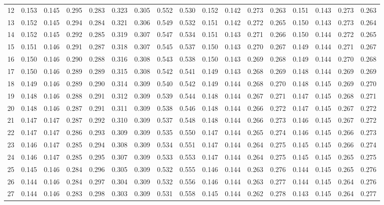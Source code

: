 \documentclass{report}
\begin{document}
\begin{appendices}
\begin{sidewaystable}
\begin{tabular}{|c|cccc|cccc|cccc|cccc|}
12 & 0.153 & 0.145 & 0.295 & 0.283 & 0.323 & 0.305 & 0.552 & 0.530 & 0.152 & 0.142 & 0.273 & 0.263 & 0.151 & 0.143 & 0.273 & 0.263\\
13 & 0.152 & 0.145 & 0.294 & 0.284 & 0.321 & 0.306 & 0.549 & 0.532 & 0.151 & 0.142 & 0.272 & 0.265 & 0.150 & 0.143 & 0.273 & 0.264\\
14 & 0.152 & 0.145 & 0.292 & 0.285 & 0.319 & 0.307 & 0.547 & 0.534 & 0.151 & 0.143 & 0.271 & 0.266 & 0.150 & 0.144 & 0.272 & 0.265\\
15 & 0.151 & 0.146 & 0.291 & 0.287 & 0.318 & 0.307 & 0.545 & 0.537 & 0.150 & 0.143 & 0.270 & 0.267 & 0.149 & 0.144 & 0.271 & 0.267\\
16 & 0.150 & 0.146 & 0.290 & 0.288 & 0.316 & 0.308 & 0.543 & 0.538 & 0.150 & 0.143 & 0.269 & 0.268 & 0.149 & 0.144 & 0.270 & 0.268\\
17 & 0.150 & 0.146 & 0.289 & 0.289 & 0.315 & 0.308 & 0.542 & 0.541 & 0.149 & 0.143 & 0.268 & 0.269 & 0.148 & 0.144 & 0.269 & 0.269\\
18 & 0.149 & 0.146 & 0.289 & 0.290 & 0.314 & 0.309 & 0.540 & 0.542 & 0.149 & 0.144 & 0.268 & 0.270 & 0.148 & 0.145 & 0.269 & 0.270\\
19 & 0.148 & 0.146 & 0.288 & 0.291 & 0.312 & 0.309 & 0.539 & 0.544 & 0.148 & 0.144 & 0.267 & 0.271 & 0.147 & 0.145 & 0.268 & 0.271\\
20 & 0.148 & 0.146 & 0.287 & 0.291 & 0.311 & 0.309 & 0.538 & 0.546 & 0.148 & 0.144 & 0.266 & 0.272 & 0.147 & 0.145 & 0.267 & 0.272\\
21 & 0.147 & 0.147 & 0.287 & 0.292 & 0.310 & 0.309 & 0.537 & 0.548 & 0.148 & 0.144 & 0.266 & 0.273 & 0.146 & 0.145 & 0.267 & 0.272\\
22 & 0.147 & 0.147 & 0.286 & 0.293 & 0.309 & 0.309 & 0.535 & 0.550 & 0.147 & 0.144 & 0.265 & 0.274 & 0.146 & 0.145 & 0.266 & 0.273\\
23 & 0.146 & 0.147 & 0.285 & 0.294 & 0.308 & 0.309 & 0.534 & 0.551 & 0.147 & 0.144 & 0.264 & 0.275 & 0.145 & 0.145 & 0.266 & 0.274\\
24 & 0.146 & 0.147 & 0.285 & 0.295 & 0.307 & 0.309 & 0.533 & 0.553 & 0.147 & 0.144 & 0.264 & 0.275 & 0.145 & 0.145 & 0.265 & 0.275\\
25 & 0.145 & 0.146 & 0.284 & 0.296 & 0.305 & 0.309 & 0.532 & 0.555 & 0.146 & 0.144 & 0.263 & 0.276 & 0.144 & 0.145 & 0.265 & 0.276\\
26 & 0.144 & 0.146 & 0.284 & 0.297 & 0.304 & 0.309 & 0.532 & 0.556 & 0.146 & 0.144 & 0.263 & 0.277 & 0.144 & 0.145 & 0.264 & 0.276\\
27 & 0.144 & 0.146 & 0.283 & 0.298 & 0.303 & 0.309 & 0.531 & 0.558 & 0.145 & 0.144 & 0.262 & 0.278 & 0.143 & 0.145 & 0.264 & 0.277\\

\end{tabular}
\end{sidewaystable}
\end{appendices}
\end{document}
